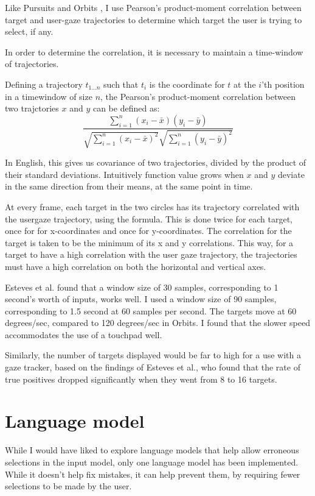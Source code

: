 \documentclass[a4paper, titlepage]{article}
\renewcommand{\%}{\scalebox{.9}{\oldpct}}
\begin{document}
Like Pursuits and Orbits \cite{pursuits,orbits}, I use Pearson's
product-moment correlation between target and user-gaze trajectories to
determine which target the user is trying to select, if any.

In order to determine the correlation, it is necessary to maintain a
time-window of trajectories. 

Defining a trajectory $t_{1 \dots n}$ such that $t_i$ is the coordinate for $t$
at the $i$'th position in a timewindow of size $n$, the Pearson's product-moment
correlation between two trajctories $x$ and $y$ can be defined as:
$$\frac{\sum\limits_{i=1}^n (x_i - \bar x)(y_i - \bar y)}
{\sqrt{\sum\limits_{i=1}^n (x_i - \bar x)^2} \sqrt{\sum\limits_{i=1}^n (y_i - \bar y)^2}}$$

In English, this gives us covariance of two trajectories, divided by the product
of their standard deviations. Intuitively function value grows when $x$ and $y$
deviate in the same direction from their means, at the same point in time.

At every frame, each target in the two circles has its trajectory correlated
with the usergaze trajectory, using the formula. This is done twice for each
target, once for for x-coordinates and once for y-coordinates. The correlation
for the target is taken to be the minimum of its x and y correlations. This way,
for a target to have a high correlation with the user gaze trajectory, the
trajectories must have a high correlation on both the horizontal and vertical
axes.

 Esteves et al.\cite{orbits} found that a window size of 30 samples,
corresponding to 1 second's worth of inputs, works well. I used a window size of
90 samples, corresponding to 1.5 second at 60 samples per second. The targets
move at 60 degrees/sec, compared to 120 degrees/sec in Orbits. I found that the
slower speed accommodates the use of a touchpad well.

Similarly, the number of targets displayed would be far to high for a use with a
gaze tracker, based on the findings of Esteves et al.\cite{orbits}, who found
that the rate of true positives dropped significantly when they went from 8 to 16
targets.

\section{Language model}
While I would have liked to explore language models that help allow erroneous
selections in the input model, only one language model has been implemented.
While it doesn't help fix mistakes, it can help prevent them, by requiring fewer
selections to be made by the user.
\end{document}
